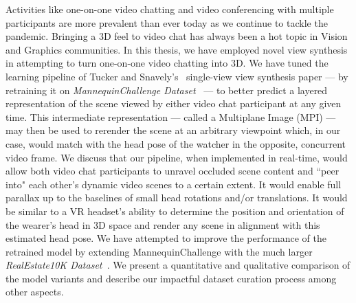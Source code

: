 Activities like one-on-one video chatting and video conferencing with multiple participants are more prevalent than ever today as we continue to tackle the pandemic. Bringing a 3D feel to video chat has always been a hot topic in Vision and Graphics communities. In this thesis, we have employed novel view synthesis in attempting to turn one-on-one video chatting into 3D. We have tuned the learning pipeline of Tucker and Snavely's~\cite{single_view_mpi} single-view view synthesis paper --- by retraining it on \textit{MannequinChallenge Dataset~\cite{li2019learning}} --- to better predict a layered representation of the scene viewed by either video chat participant at any given time. This intermediate representation --- called a Multiplane Image (MPI) --- may then be used to rerender the scene at an arbitrary viewpoint which, in our case, would match with the head pose of the watcher in the opposite, concurrent video frame. We discuss that our pipeline, when implemented in real-time, would allow both video chat participants to unravel occluded scene content and ``peer into" each other's dynamic video scenes to a certain extent. It would enable full parallax up to the baselines of small head rotations and/or translations. It would be similar to a VR headset's ability to determine the position and orientation of the wearer's head in 3D space and render any scene in alignment with this estimated head pose. We have attempted to improve the performance of the retrained model by extending MannequinChallenge with the much larger \textit{RealEstate10K Dataset~\cite{zhou2018stereo}}. We present a quantitative and qualitative comparison of the model variants and describe our impactful dataset curation process among other aspects.